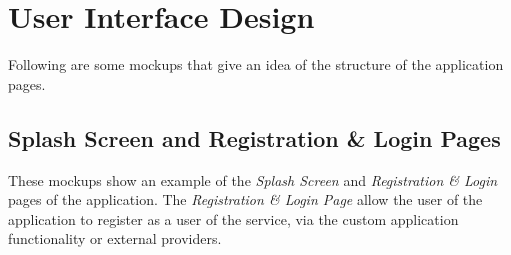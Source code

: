 \chapter{User Interface Design} \label{chap4}
Following are some mockups that give an idea of the structure of the application pages.

\section{Splash Screen and Registration \& Login Pages}
These mockups show an example of the \textit{Splash Screen} and \textit{Registration \& Login} pages of the application. The \textit{Registration \& Login Page} allow the user of the application to register as a user of the service, via the custom application functionality or external providers.\\

